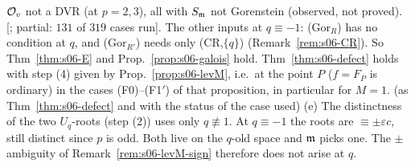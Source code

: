 \begin{remark}
$\mathcal{O}_v$ not a DVR (at $p=2,3$), all with $S_{\mathfrak{m}}$ not Gorenstein (observed, not proved). \stcomp{} [; partial: $131$ of $319$ cases run].
The other inputs at $q\equiv-1$: (Gor$_R$) has no condition at $q$, and (Gor$_{R'}$) needs only (CR,$\{q\}$) (Remark~\ref{rem:s06-CR}).
So Thm~\ref{thm:s06-E} and Prop.~\ref{prop:s06-galois} hold. Thm~\ref{thm:s06-defect} holds with step (4) given by
Prop.~\ref{prop:s06-levM}, i.e.\ at the point $P$ ($f=F_P$ is ordinary) in the cases (F0)--(F1$'$) of that proposition, in
particular for $M=1$. \stpmc{} (as Thm~\ref{thm:s06-defect} and with the status of the case used)
(e) The distinctness of the two $U_q$-roots (step (2)) uses only $q\not\equiv1$. At $q\equiv-1$ the roots are $\equiv\pm\varepsilon c$, still
distinct since $p$ is odd. Both live on the $q$-old space and $\mathfrak{m}$ picks one. The $\pm$ ambiguity of Remark~\ref{rem:s06-levM-sign}
therefore does not arise at $q$.

\end{remark}

